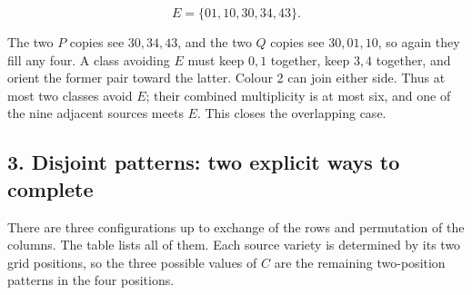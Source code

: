\documentclass[
  10pt,
]{article}
\begin{document}
\[
E=\{01,10,30,34,43\}.
\]

The two \(P\) copies see \(30,34,43\), and the two \(Q\) copies see
\(30,01,10\), so again they fill any four. A class avoiding \(E\) must
keep \(0,1\) together, keep \(3,4\) together, and orient the former pair
toward the latter. Colour 2 can join either side. Thus at most two
classes avoid \(E\); their combined multiplicity is at most six, and one
of the nine adjacent sources meets \(E\). This closes the overlapping
case.

\hypertarget{disjoint-patterns-two-explicit-ways-to-complete}{%
\subsection*{3. Disjoint patterns: two explicit ways to
complete}\label{disjoint-patterns-two-explicit-ways-to-complete}}

There are three configurations up to exchange of the rows and
permutation of the columns. The table lists all of them. Each source
variety is determined by its two grid positions, so the three possible
values of \(C\) are the remaining two-position patterns in the four
positions.
\end{document}
